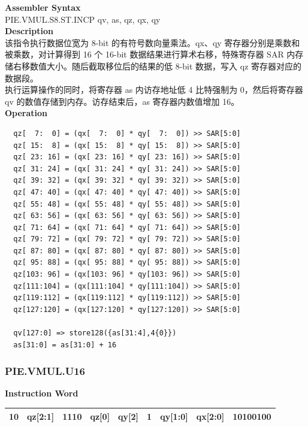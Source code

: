 \textbf{Assembler Syntax} \\
PIE.VMUL.S8.ST.INCP qv, as, qz, qx, qy \\
\textbf{Description} \\
该指令执行数据位宽为 8-bit 的有符号数向量乘法。qx、qy 寄存器分别是乘数和被乘数，对计算得到 16 个 16-bit 数据结果进行算术右移，特殊寄存器 SAR 内存储右移数值大小。随后截取移位后的结果的低 8-bit 数据，写入 qz 寄存器对应的数据段。\\ 执行运算操作的同时，将寄存器 as 内访存地址低 4 比特强制为 0，然后将寄存器 qv 的数值存储到内存。访存结束后，as 寄存器内数值增加 16。\\
\textbf{Operation}
\begin{lstlisting}
  qz[  7:  0] = (qx[  7:  0] * qy[  7:  0]) >> SAR[5:0]
  qz[ 15:  8] = (qx[ 15:  8] * qy[ 15:  8]) >> SAR[5:0]
  qz[ 23: 16] = (qx[ 23: 16] * qy[ 23: 16]) >> SAR[5:0]
  qz[ 31: 24] = (qx[ 31: 24] * qy[ 31: 24]) >> SAR[5:0]
  qz[ 39: 32] = (qx[ 39: 32] * qy[ 39: 32]) >> SAR[5:0]
  qz[ 47: 40] = (qx[ 47: 40] * qy[ 47: 40]) >> SAR[5:0]
  qz[ 55: 48] = (qx[ 55: 48] * qy[ 55: 48]) >> SAR[5:0]
  qz[ 63: 56] = (qx[ 63: 56] * qy[ 63: 56]) >> SAR[5:0]
  qz[ 71: 64] = (qx[ 71: 64] * qy[ 71: 64]) >> SAR[5:0]
  qz[ 79: 72] = (qx[ 79: 72] * qy[ 79: 72]) >> SAR[5:0]
  qz[ 87: 80] = (qx[ 87: 80] * qy[ 87: 80]) >> SAR[5:0]
  qz[ 95: 88] = (qx[ 95: 88] * qy[ 95: 88]) >> SAR[5:0]
  qz[103: 96] = (qx[103: 96] * qy[103: 96]) >> SAR[5:0]
  qz[111:104] = (qx[111:104] * qy[111:104]) >> SAR[5:0]
  qz[119:112] = (qx[119:112] * qy[119:112]) >> SAR[5:0]
  qz[127:120] = (qx[127:120] * qy[127:120]) >> SAR[5:0]

  qv[127:0] => store128({as[31:4],4{0}})
  as[31:0] = as[31:0] + 16
\end{lstlisting}

\newpage
\subsubsection{PIE.VMUL.U16}\label{instruction:PIEVMULU16}
\setlength\tabcolsep{6pt}
\textbf{Instruction Word} \\
\begin{tabular}{|c|c|c|c|c|c|c|c|c|}
	\hline
	10 & qz[2:1] & 1110 & qz[0] & qy[2] & 1 & qy[1:0] & qx[2:0] & 10100100 \\
	\hline
\end{tabular}

